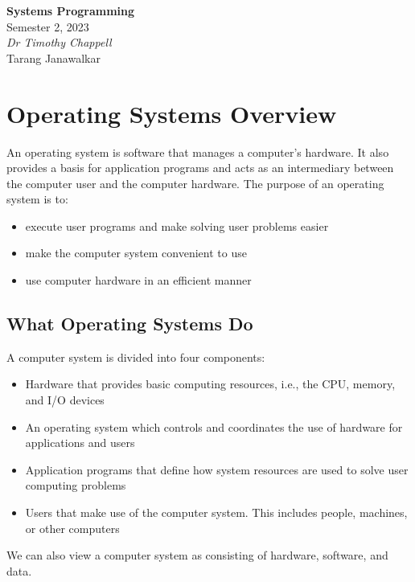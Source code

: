 \documentclass{article}
\date{}
\newcommand{\unitName}{Systems Programming}
\newcommand{\unitTime}{Semester 2, 2023}
\newcommand{\unitCoordinator}{Dr Timothy Chappell}
\newcommand{\documentAuthors}{Tarang Janawalkar}
\begin{document}
%
\begin{titlepage}
    \vspace*{\fill}
    \begin{center}
        \LARGE{\textbf{\unitName}} \\[0.1in]
        \normalsize{\unitTime} \\[0.2in]
        \normalsize\textit{\unitCoordinator} \\[0.2in]
        \documentAuthors
    \end{center}
    \vspace*{\fill}
    \doclicenseThis
    \thispagestyle{empty}
\end{titlepage}
\newpage
%
\tableofcontents
\newpage
%
\section{Operating Systems Overview}
An operating system is software that manages a computer's hardware. It
also provides a basis for application programs and acts as an
intermediary between the computer user and the computer hardware. The
purpose of an operating system is to:
\begin{itemize}
    \item execute user programs and make solving user problems easier
    \item make the computer system convenient to use
    \item use computer hardware in an efficient manner
\end{itemize}
\subsection{What Operating Systems Do}
A computer system is divided into four components:
\begin{itemize}
    \item Hardware that provides basic computing resources, i.e., the
          CPU, memory, and I/O devices
    \item An operating system which controls and coordinates the use of
          hardware for applications and users
    \item Application programs that define how system resources are
          used to solve user computing problems
    \item Users that make use of the computer system. This includes
          people, machines, or other computers
\end{itemize}
We can also view a computer system as consisting of hardware, software,
and data.
\end{document}

